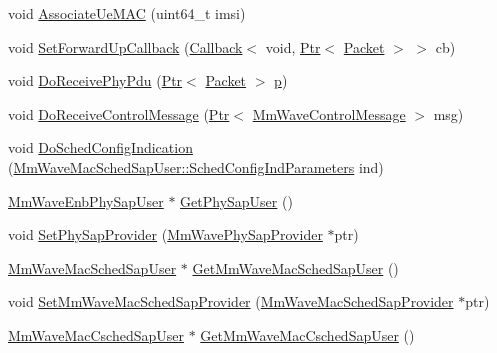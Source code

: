 \begin{DoxyCompactItemize}
\item 
void \hyperlink{classns3_1_1MmWaveEnbMac_adf941d6c1d018bb4af77f355ea8369f4}{Associate\+Ue\+M\+AC} (uint64\+\_\+t imsi)
\item 
void \hyperlink{classns3_1_1MmWaveEnbMac_ab9d7c2a6b3663211c66ccd2b07d78b81}{Set\+Forward\+Up\+Callback} (\hyperlink{classns3_1_1Callback}{Callback}$<$ void, \hyperlink{classns3_1_1Ptr}{Ptr}$<$ \hyperlink{classns3_1_1Packet}{Packet} $>$ $>$ cb)
\item 
void \hyperlink{classns3_1_1MmWaveEnbMac_a0eb5cf94cfb4b85f8334a11bf1802d66}{Do\+Receive\+Phy\+Pdu} (\hyperlink{classns3_1_1Ptr}{Ptr}$<$ \hyperlink{classns3_1_1Packet}{Packet} $>$ \hyperlink{lte__link__budget__x2__handover__measures_8m_ac9de518908a968428863f829398a4e62}{p})
\item 
void \hyperlink{classns3_1_1MmWaveEnbMac_aa04cb4e9bc76c6576b0ba7253041b7f4}{Do\+Receive\+Control\+Message} (\hyperlink{classns3_1_1Ptr}{Ptr}$<$ \hyperlink{classns3_1_1MmWaveControlMessage}{Mm\+Wave\+Control\+Message} $>$ msg)
\item 
void \hyperlink{classns3_1_1MmWaveEnbMac_a2aeea39c3c0088af00ceaa7177bbf552}{Do\+Sched\+Config\+Indication} (\hyperlink{structns3_1_1MmWaveMacSchedSapUser_1_1SchedConfigIndParameters}{Mm\+Wave\+Mac\+Sched\+Sap\+User\+::\+Sched\+Config\+Ind\+Parameters} ind)
\item 
\hyperlink{classns3_1_1MmWaveEnbPhySapUser}{Mm\+Wave\+Enb\+Phy\+Sap\+User} $\ast$ \hyperlink{classns3_1_1MmWaveEnbMac_af4b87b1ac841ffae3419a15761787d00}{Get\+Phy\+Sap\+User} ()
\item 
void \hyperlink{classns3_1_1MmWaveEnbMac_a897880b8941428a61c4217a6e687e339}{Set\+Phy\+Sap\+Provider} (\hyperlink{classns3_1_1MmWavePhySapProvider}{Mm\+Wave\+Phy\+Sap\+Provider} $\ast$ptr)
\item 
\hyperlink{classns3_1_1MmWaveMacSchedSapUser}{Mm\+Wave\+Mac\+Sched\+Sap\+User} $\ast$ \hyperlink{classns3_1_1MmWaveEnbMac_a6ff0f0868d63e374a852efd128ca9055}{Get\+Mm\+Wave\+Mac\+Sched\+Sap\+User} ()
\item 
void \hyperlink{classns3_1_1MmWaveEnbMac_af7d468cabbab57f892d996fae899abe5}{Set\+Mm\+Wave\+Mac\+Sched\+Sap\+Provider} (\hyperlink{classns3_1_1MmWaveMacSchedSapProvider}{Mm\+Wave\+Mac\+Sched\+Sap\+Provider} $\ast$ptr)
\item 
\hyperlink{classns3_1_1MmWaveMacCschedSapUser}{Mm\+Wave\+Mac\+Csched\+Sap\+User} $\ast$ \hyperlink{classns3_1_1MmWaveEnbMac_ae4d8f49444287f40ca36dd5d6c351ac3}{Get\+Mm\+Wave\+Mac\+Csched\+Sap\+User} ()
\item 

\end{DoxyCompactItemize}
